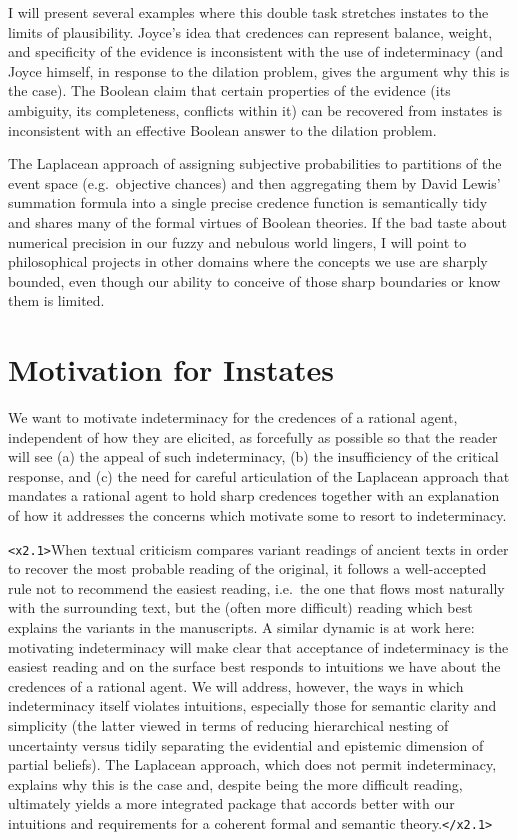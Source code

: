 \documentclass[11pt]{article}
\begin{document}
I will present several examples where this double task stretches
instates to the limits of plausibility. Joyce's idea that credences
can represent balance, weight, and specificity of the evidence is
inconsistent with the use of indeterminacy (and Joyce himself, in
response to the dilation problem, gives the argument why this is the
case). The Boolean claim that certain properties of the evidence (its
ambiguity, its completeness, conflicts within it) can be recovered
from instates is inconsistent with an effective Boolean answer to the
dilation problem.

The Laplacean approach of assigning subjective probabilities to
partitions of the event space (e.g.\ objective chances) and then
aggregating them by David Lewis' summation formula into a single
precise credence function is semantically tidy and shares many of the
formal virtues of Boolean theories. If the bad taste about numerical
precision in our fuzzy and nebulous world lingers, I will point to
philosophical projects in other domains where the concepts we use are
sharply bounded, even though our ability to conceive of those sharp
boundaries or know them is limited.

\section{Motivation for Instates}
\label{MotivationForIndeterminateCredalStates}

We want to motivate indeterminacy for the credences of a rational
agent, independent of how they are elicited, as forcefully as possible
so that the reader will see (a) the appeal of such indeterminacy, (b)
the insufficiency of the critical response, and (c) the need for
careful articulation of the Laplacean approach that mandates a
rational agent to hold sharp credences together with an explanation of
how it addresses the concerns which motivate some to resort to
indeterminacy.

\texttt{<x2.1>}When textual criticism compares variant readings of
ancient texts in order to recover the most probable reading of the
original, it follows a well-accepted rule not to recommend the easiest
reading, i.e.\ the one that flows most naturally with the surrounding
text, but the (often more difficult) reading which best explains the
variants in the manuscripts. A similar dynamic is at work here:
motivating indeterminacy will make clear that acceptance of
indeterminacy is the easiest reading and on the surface best responds
to intuitions we have about the credences of a rational agent. We will
address, however, the ways in which indeterminacy itself violates
intuitions, especially those for semantic clarity and simplicity (the
latter viewed in terms of reducing hierarchical nesting of uncertainty
versus tidily separating the evidential and epistemic dimension of
partial beliefs). The Laplacean approach, which does not permit
indeterminacy, explains why this is the case and, despite being the
more difficult reading, ultimately yields a more integrated package
that accords better with our intuitions and requirements for a
coherent formal and semantic theory.\texttt{</x2.1>}
\end{document}
